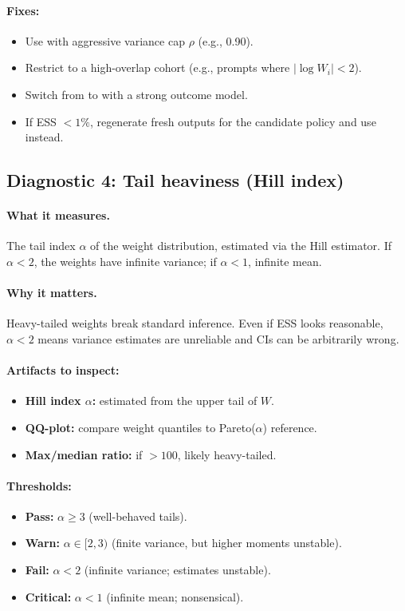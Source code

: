 \paragraph{Fixes:}
\begin{itemize}
\item Use \simcal{} with aggressive variance cap $\rho$ (e.g., 0.90).
\item Restrict to a high-overlap cohort (e.g., prompts where $|\log W_i| < 2$).
\item Switch from \ips{} to \dr{} with a strong outcome model.
\item If ESS $< 1\%$, regenerate fresh outputs for the candidate policy and use \dm{} instead.
\end{itemize}

\subsection{Diagnostic 4: Tail heaviness (Hill index)}

\paragraph{What it measures.} The tail index $\alpha$ of the weight distribution, estimated via the Hill estimator. If $\alpha < 2$, the weights have infinite variance; if $\alpha < 1$, infinite mean.

\paragraph{Why it matters.} Heavy-tailed weights break standard inference. Even if ESS looks reasonable, $\alpha < 2$ means variance estimates are unreliable and CIs can be arbitrarily wrong.

\paragraph{Artifacts to inspect:}
\begin{itemize}
\item \textbf{Hill index $\alpha$:} estimated from the upper tail of $W$.
\item \textbf{QQ-plot:} compare weight quantiles to Pareto($\alpha$) reference.
\item \textbf{Max/median ratio:} if $> 100$, likely heavy-tailed.
\end{itemize}

\paragraph{Thresholds:}
\begin{itemize}
\item \textbf{Pass:} $\alpha \ge 3$ (well-behaved tails).
\item \textbf{Warn:} $\alpha \in [2, 3)$ (finite variance, but higher moments unstable).
\item \textbf{Fail:} $\alpha < 2$ (infinite variance; estimates unstable).
\item \textbf{Critical:} $\alpha < 1$ (infinite mean; nonsensical).
\end{itemize}

